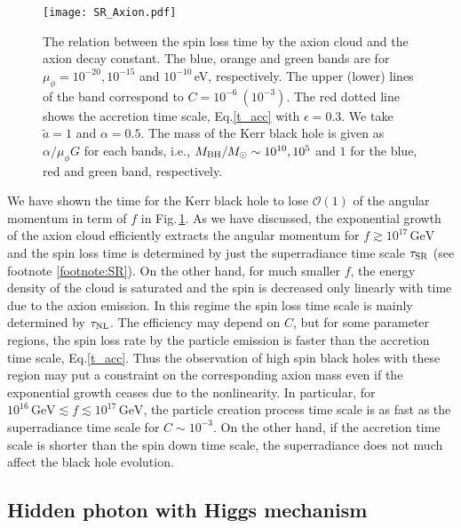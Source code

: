 \documentclass[%
 preprint,
 nofootinbib,
 amsmath,amssymb,
 aps,
 a4paper
]{revtex4-1}
\begin{document}
\begin{figure}[t]
\begin{center}
\texttt{[image: SR\_Axion.pdf]}
\end{center}
\caption{
 The relation between the spin loss time by the axion cloud and the axion decay constant. The blue, orange and green bands are for $\mu_\phi = 10^{-20}, 10^{-15}$ and $10^{-10}$\,eV, respectively. The upper (lower) lines of the band correspond to $C=10^{-6}\ (10^{-3})$. The red dotted line shows the accretion time scale, Eq.\eqref{t_acc} with $\epsilon = 0.3$. We take $\tilde a = 1$ and $\alpha = 0.5$. The mass of the Kerr black hole is given as $\alpha / \mu_\phi G$ for each bands, i.e., $M_{\rm BH} / M_{\odot} \sim 10^{10}, 10^5$ and $1$ for the blue, red and green band, respectively.
}
\label{fig:Axion_spin_loss}
\end{figure}

We have shown the time for the Kerr black hole to lose $\mathcal O(1)$ of the angular momentum in term of $f$ in Fig.\,\ref{fig:Axion_spin_loss}. As we have discussed, the exponential growth of the axion cloud efficiently extracts the angular momentum for $f \gtrsim 10^{17}\,\text{GeV}$ and the spin loss time is determined by just the superradiance time scale $\tau_{\rm SR}$ (see footnote \ref{footnote:SR}). On the other hand, for much smaller $f$, the energy density of the cloud is saturated and the spin is decreased only linearly with time due to the axion emission. In this regime the spin loss time scale is mainly  determined by $\tau_{\rm NL}$.
The efficiency may depend on $C$, but for some parameter regions, the spin loss rate by the particle emission is faster than the accretion time scale, Eq.\eqref{t_acc}. Thus the observation of high spin black holes with these region may put a constraint on the corresponding axion mass even if the exponential growth ceases due to the nonlinearity. In particular, for $10^{16}\,\text{GeV} \lesssim f \lesssim 10^{17}\,\text{GeV}$, the particle creation process time scale is as fast as the superradiance time scale for $C \sim 10^{-3}$.
On the other hand, if the accretion time scale is shorter than the spin down time scale, the superradiance does not much affect the black hole evolution. 



\subsection{Hidden photon with Higgs mechanism}  \label{sec:hidden}
\end{document}
